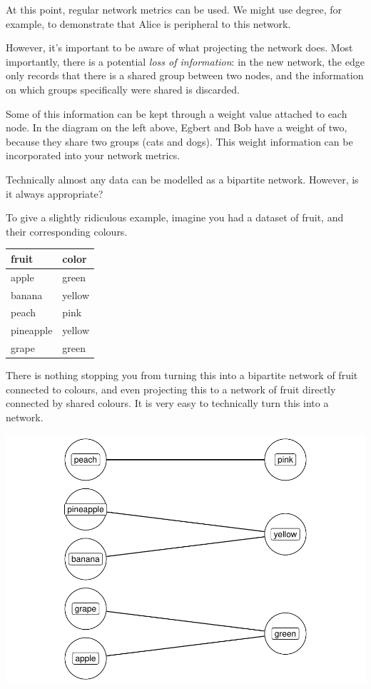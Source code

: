 \documentclass[
]{book}
\begin{document}
At this point, regular network metrics can be used. We might use degree, for example, to demonstrate that Alice is peripheral to this network.

However, it's important to be aware of what projecting the network does. Most importantly, there is a potential \emph{loss of information}: in the new network, the edge only records that there is a shared group between two nodes, and the information on which groups specifically were shared is discarded.

Some of this information can be kept through a weight value attached to each node. In the diagram on the left above, Egbert and Bob have a weight of two, because they share two groups (cats and dogs). This weight information can be incorporated into your network metrics.

Technically almost any data can be modelled as a bipartite network. However, is it always appropriate?

To give a slightly ridiculous example, imagine you had a dataset of fruit, and their corresponding colours.

\begin{tabular}[t]{ll}
\toprule
fruit & color\\
\midrule
apple & green\\
banana & yellow\\
peach & pink\\
pineapple & yellow\\
grape & green\\
\bottomrule
\end{tabular}

There is nothing stopping you from turning this into a bipartite network of fruit connected to colours, and even projecting this to a network of fruit directly connected by shared colours. It is very easy to technically turn this into a network.

\includegraphics{_main_files/figure-latex/unnamed-chunk-71-1.pdf}
\end{document}
